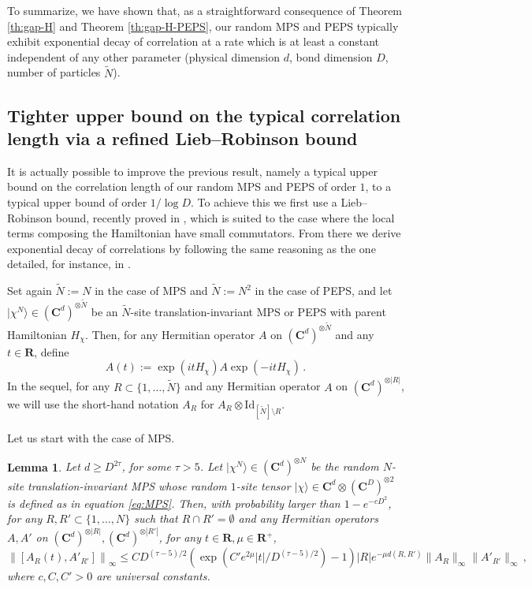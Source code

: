 \documentclass{amsart}
\newtheorem{lemma}[theorem]{Lemma}
\newcommand{\R}{\mathbf{R}}
\newcommand{\C}{\mathbf{C}}
\renewcommand{\leq}{\leqslant}
\renewcommand{\geq}{\geqslant}
\newcommand{\Id}{\mathrm{Id}}
\newcommand{\ket}[1]{| #1 \rangle}
\begin{document}
To summarize, we have shown that, as a straightforward consequence of Theorem \ref{th:gap-H} and Theorem \ref{th:gap-H-PEPS}, our random MPS and PEPS typically exhibit exponential decay of correlation at a rate which is at least a constant independent of any other parameter (physical dimension $d$, bond dimension $D$, number of particles $\tilde{N}$).

\subsection{Tighter upper bound on the typical correlation length via a refined Lieb--Robinson bound} \hfill\par\smallskip

It is actually possible to improve the previous result, namely a typical upper bound on the correlation length of our random MPS and PEPS of order $1$, to a typical upper bound of order $1/\log D$. To achieve this we first use a Lieb--Robinson bound, recently proved in \cite{HHKL}, which is suited to the case where the local terms composing the Hamiltonian have small commutators. From there we derive exponential decay of correlations by following the same reasoning as the one detailed, for instance, in \cite{Has3}.

Set again $\tilde{N}:=N$ in the case of MPS and $\tilde{N}:=N^2$ in the case of PEPS, and let $\ket{\chi^{N}}\in(\C^d)^{\otimes \tilde{N}}$ be an $\tilde{N}$-site translation-invariant MPS or PEPS with parent Hamiltonian $H_{\chi}$. Then, for any Hermitian operator $A$ on $(\C^d)^{\otimes \tilde{N}}$ and any $t\in\R$, define
\[ A(t) := \exp(itH_{\chi})A\exp(-itH_{\chi}) \, . \]
In the sequel, for any $R\subset\{1,\ldots,\tilde{N}\}$ and any Hermitian operator $A$ on $(\C^d)^{\otimes |R|}$, we will use the short-hand notation $A_R$ for $A_R\otimes \Id_{[\tilde{N}]\setminus R}$.

Let us start with the case of MPS.

\begin{lemma} \label{lem:LR-MPS}
    Let $d\geq D^{2\tau}$, for some $\tau>5$. Let $\ket{\chi^{N}}\in(\C^d)^{\otimes N}$ be the random $N$-site translation-invariant MPS whose random $1$-site tensor $\ket{\chi}\in\C^d\otimes(\C^D)^{\otimes 2}$ is defined as in equation \eqref{eq:MPS}. Then, with probability larger than $1-e^{-cD^2}$, for any $R,R'\subset\{1,\ldots,N\}$ such that $R\cap R'=\emptyset$ and any Hermitian operators $A,A'$ on $(\C^d)^{\otimes |R|},(\C^d)^{\otimes |R'|}$, for any $t\in\R,\mu\in\R^+$,
    \[ \left\| \left[ A_R(t),A'_{R'} \right] \right\|_{\infty} \leq CD^{(\tau-5)/2} \left( \exp\left(C'e^{2\mu}|t|/D^{(\tau-5)/2}\right) -1 \right) |R|e^{-\mu d(R,R')} \|A_R\|_{\infty}\|A'_{R'}\|_{\infty} \, , \]
    where $c,C,C'>0$ are universal constants.
\end{lemma}
\end{document}
